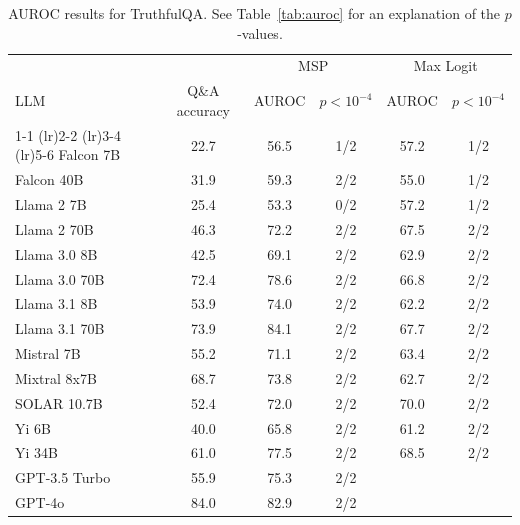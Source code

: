 \begin{table}[h]
\caption{AUROC results for TruthfulQA. See Table~\ref{tab:auroc} for an explanation of the $p$-values.}
\label{tab:auroc_max}
\centering
\begin{tabular}{lccccc}
\toprule
& & \multicolumn{2}{c}{MSP} & \multicolumn{2}{c}{Max Logit} \\ 
LLM & Q\&A accuracy & AUROC & $p < 10^{-4}$ & AUROC & $p < 10^{-4}$ \\ 
\cmidrule(lr){1-1} \cmidrule(lr){2-2} \cmidrule(lr){3-4} \cmidrule(lr){5-6} 
Falcon 7B & 22.7 & 56.5 & 1/2 & 57.2 & 1/2\\
Falcon 40B & 31.9 & 59.3 & 2/2 & 55.0 & 1/2\\
Llama 2 7B & 25.4 & 53.3 & 0/2 & 57.2 & 1/2\\
Llama 2 70B & 46.3 & 72.2 & 2/2 & 67.5 & 2/2\\
Llama 3.0 8B & 42.5 & 69.1 & 2/2 & 62.9 & 2/2\\
Llama 3.0 70B & 72.4 & 78.6 & 2/2 & 66.8 & 2/2\\
Llama 3.1 8B & 53.9 & 74.0 & 2/2 & 62.2 & 2/2\\
Llama 3.1 70B & 73.9 & 84.1 & 2/2 & 67.7 & 2/2\\
Mistral 7B & 55.2 & 71.1 & 2/2 & 63.4 & 2/2\\
Mixtral 8x7B & 68.7 & 73.8 & 2/2 & 62.7 & 2/2\\
SOLAR 10.7B & 52.4 & 72.0 & 2/2 & 70.0 & 2/2\\
Yi 6B & 40.0 & 65.8 & 2/2 & 61.2 & 2/2\\
Yi 34B & 61.0 & 77.5 & 2/2 & 68.5 & 2/2\\
GPT-3.5 Turbo & 55.9 & 75.3 & 2/2 &  &\\
GPT-4o & 84.0 & 82.9 & 2/2 &  & \\
\bottomrule
\end{tabular}
\end{table}
